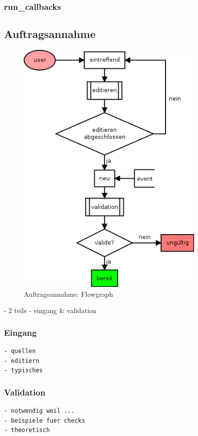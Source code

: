 \subsubsection{run\_callbacks}


\subsection{Auftragsannahme}


\begin{figure}[ht] 
  \label{fig:lebenszyklus-auftrag-eingang}
  \begin{center}
      \includegraphics[height=5in]{imageinput/lebenszyklus-auftrag-eingang.png}
  \end{center}
  \caption{Auftragsannahme: Flowgraph}
\end{figure}

- 2 teile
- eingang \& validation


\subsubsection{Eingang}

\begin{verbatim}
- quellen
- editiern
- typisches
\end{verbatim}

\subsubsection{Validation}
\begin{verbatim}
- notwendig weil ...
- beispiele fuer checks
- theoretisch
\end{verbatim}


